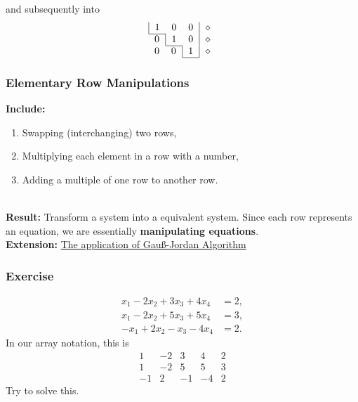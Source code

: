 \documentclass[12pt, t]{beamer}
\newcommand{\nullspace}{~\\[15pt]}
\begin{document}
\begin{frame}
    and subsequently into \\
    \begin{equation}
        \begin{array}{c}
            \begin{tabular}{|ccc|c}
                1 & $0$ & $0$ & $\diamond$ \\ \cline{1-1}
            \end{tabular} \\
            \begin{tabular}{c|cc|c}
                0 & $1$ & $0$ & $\diamond$ \\ \cline{2-2}
            \end{tabular} \\
            \begin{tabular}{cc|c|c}
                0 & $0$ & $1$ & $\diamond$ \\
                \cline{3-3}
            \end{tabular}
        \end{array}
    \end{equation}
\end{frame}

\begin{frame}
    \frametitle{Elementary Row Manipulations}
    \textbf{Include:}
    \begin{enumerate}
        \item Swapping (interchanging) two rows,
        \item Multiplying each element in a row with a number,
        \item Adding a multiple of one row to another row.
    \end{enumerate}
    ~\\[15pt]

    \textbf{Result:} Transform a system into a equivalent system.
    Since each row represents an equation, we are essentially \textbf{manipulating equations}.\nullspace

    \textbf{Extension:}
    \href{https://en.wikipedia.org/wiki/Gaussian_elimination\#Applications}{The application of Gau\ss-Jordan Algorithm}
\end{frame}

\begin{frame}
    \frametitle{Exercise}
    \begin{align*}
        x_1-2x_2+3x_3+4x_4 & =2, \\
        x_1-2x_2+5x_3+5x_4 & =3, \\
        -x_1+2x_2-x_3-4x_4 & =2.
    \end{align*}
    In our array notation, this is
    \begin{equation*}
        \begin{array}{cccc|c}
            1  & -2 & 3  & 4  & 2 \\
            1  & -2 & 5  & 5  & 3 \\
            -1 & 2  & -1 & -4 & 2
        \end{array}
    \end{equation*}
    Try to solve this.
\end{frame}
\end{document}
